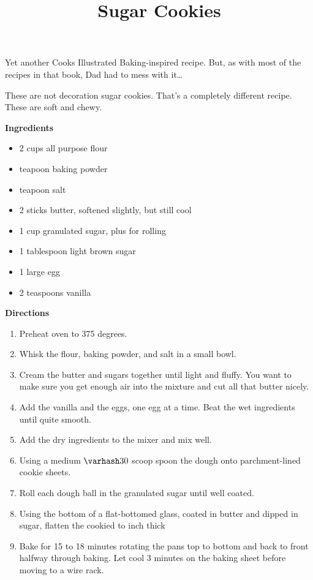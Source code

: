 \documentclass{article}
\title{Sugar Cookies}
\begin{document}
Yet another Cooks Illustrated Baking-inspired recipe. But, as with most of the recipes in that
book, Dad had to mess with it\dots

These are not decoration sugar cookies. That's a completely different recipe. These are soft
and chewy.

\textbf{Ingredients}

\begin{multicols}{2}
    \begin{itemize}
        \item 2 cups all purpose flour
        \item {} teapoon baking powder
        \item {} teapoon salt

        \item 2 sticks butter, softened slightly, but still cool
        \item 1 cup granulated sugar, plus  for rolling
        \item 1 tablespoon light brown sugar

        \item 1 large egg
        \item 2 teaspoons vanilla
    \end{itemize}
\end{multicols}

\textbf{Directions}

\begin{enumerate}
    \item Preheat oven to 375 degrees.
    \item Whisk the flour, baking powder, and salt in a small bowl.
    \item Cream the butter and sugars together until light and fluffy. You want to make sure you get
          enough air into the mixture and cut all that butter nicely.
    \item Add the vanilla and the eggs, one egg at a time. Beat the wet ingredients until quite smooth.
    \item Add the dry ingredients to the mixer and mix well.
    \item Using a medium $\varhash 30$ scoop spoon the dough onto parchment-lined cookie sheets.
    \item Roll each dough ball in the granulated sugar until well coated.
    \item Using the bottom of a flat-bottomed glass, coated in butter and dipped in sugar,
          flatten the cookied to  inch thick
    \item Bake for 15 to 18 minutes rotating the pans top to bottom and back to front halfway
          through baking. Let cool 3 minutes on the baking sheet before moving to a wire rack.
\end{enumerate}
\end{document}

